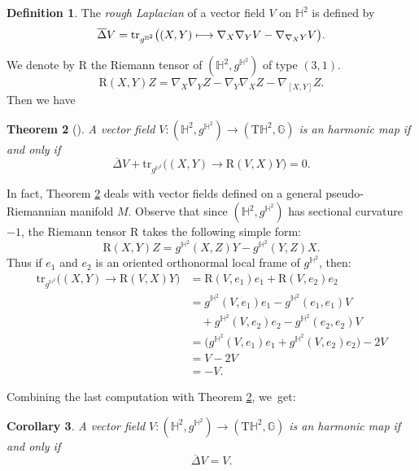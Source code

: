 \documentclass[JEP,XML,SOM,Unicode,NoEqCountersInSection, NoFloatCountersInSection,published]{cedram}
\newcommand\mto{\mathchoice{\longmapsto}{\mapsto}{\mapsto}{\mapsto}}
\let\ra\rightarrow
\theoremstyle{plain}
\newtheorem{cor}{Corollary}[section]
\newtheorem{theorem}[cor]{Theorem}
\theoremstyle{definition}
\newtheorem{defi}[cor]{Definition}
\begin{document}
\begin{defi}
The \emph{rough Laplacian} of a vector field $V$ on $\mathbb{H}^2$ is defined by
\[
\overline{\Delta}V=\mathrm{tr}_{g^{\mathbb{H}^2}}\big((X,Y)\mto \nabla_X\nabla_Y V-\nabla_{\nabla_X Y}V \big).
\]
\end{defi}
We denote by $\mathrm{R}$ the Riemann tensor of $(\mathbb{H}^2,g^{\mathbb{H}^2})$ of type $(3,1)$.
\[
\mathrm{R}(X,Y)Z=\nabla_X\nabla_YZ-\nabla_Y\nabla_XZ-\nabla_{[X,Y]}Z.
\]
Then we have
\begin{theorem}[{\cite[Prop.\,4.1]{on_harmonic_vector_field}}]\label{on_harmonic_vector_field}
A vector field $V:(\mathbb{H}^2,g^{\mathbb{H}^2})\to(\mathrm{T}\mathbb{H}^2,\mathbb{G})$ is an harmonic map if and only if
\[
\overline{\Delta}V+\mathrm{tr}_{g^{\mathbb{H}^2}}\big((X,Y)\ra\mathrm{R}(V,X)Y \big)=0.
\]
\end{theorem}
In fact, Theorem \ref{on_harmonic_vector_field} deals with vector fields defined on a general pseudo-Riemannian manifold $M$. Observe that since $(\mathbb{H}^2,g^{\mathbb{H}^2})$ has sectional curvature $-1$, the Riemann tensor $\mathrm{R}$ takes the following simple form:
\[
\mathrm{R}(X,Y)Z=g^{\mathbb{H}^2}(X,Z)Y-g^{\mathbb{H}^2}(Y,Z)X.
\]
Thus if $e_1$ and $e_2$ is an oriented orthonormal local frame of $g^{\mathbb{H}^2}$, then:
\begin{align*}
\mathrm{tr}_{g^{\mathbb{H}^2}}\big((X,Y)\to\mathrm{R}(V,X)Y \big)
&=\mathrm{R}(V,e_1)e_1+\mathrm{R}(V,e_2)e_2 \\
&= g^{\mathbb{H}^2}(V,e_1)e_1 - g^{\mathbb{H}^2}(e_1,e_1)V \\
&\quad + g^{\mathbb{H}^2}(V,e_2)e_2 - g^{\mathbb{H}^2}(e_2,e_2)V \\
&= \big(g^{\mathbb{H}^2}(V,e_1)e_1+g^{\mathbb{H}^2}(V,e_2)e_2\big)-2V \\
&= V-2V \\
&= -V.
\end{align*}

Combining the last computation with Theorem \ref{on_harmonic_vector_field}, we~get:

\begin{cor}\label{cor_on_harmonic_vector_field}
A vector field $V:(\mathbb{H}^2,g^{\mathbb{H}^2})\to(\mathrm{T}\mathbb{H}^2,\mathbb{G})$ is an harmonic map if and only if
\[
\overline{\Delta}V=V.
\]
\end{cor}
\end{document}

